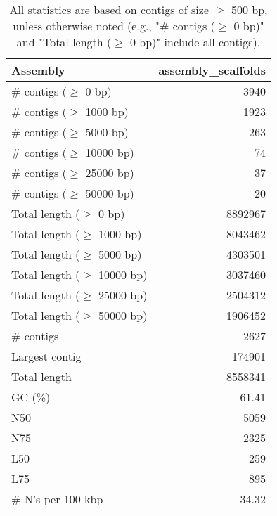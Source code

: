\documentclass[12pt,a4paper]{article}
\begin{document}
\begin{table}[ht]
\begin{center}
\caption{All statistics are based on contigs of size $\geq$ 500 bp, unless otherwise noted (e.g., "\# contigs ($\geq$ 0 bp)" and "Total length ($\geq$ 0 bp)" include all contigs).}
\begin{tabular}{|l*{1}{|r}|}
\hline
Assembly & assembly\_scaffolds \\ \hline
\# contigs ($\geq$ 0 bp) & 3940 \\ \hline
\# contigs ($\geq$ 1000 bp) & 1923 \\ \hline
\# contigs ($\geq$ 5000 bp) & 263 \\ \hline
\# contigs ($\geq$ 10000 bp) & 74 \\ \hline
\# contigs ($\geq$ 25000 bp) & 37 \\ \hline
\# contigs ($\geq$ 50000 bp) & 20 \\ \hline
Total length ($\geq$ 0 bp) & 8892967 \\ \hline
Total length ($\geq$ 1000 bp) & 8043462 \\ \hline
Total length ($\geq$ 5000 bp) & 4303501 \\ \hline
Total length ($\geq$ 10000 bp) & 3037460 \\ \hline
Total length ($\geq$ 25000 bp) & 2504312 \\ \hline
Total length ($\geq$ 50000 bp) & 1906452 \\ \hline
\# contigs & 2627 \\ \hline
Largest contig & 174901 \\ \hline
Total length & 8558341 \\ \hline
GC (\%) & 61.41 \\ \hline
N50 & 5059 \\ \hline
N75 & 2325 \\ \hline
L50 & 259 \\ \hline
L75 & 895 \\ \hline
\# N's per 100 kbp & 34.32 \\ \hline
\end{tabular}
\end{center}
\end{table}
\end{document}
